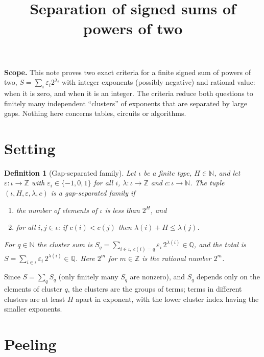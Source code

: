 \documentclass[11pt]{article}
\title{Separation of signed sums of powers of two}
\author{}
\date{}
\newtheorem{definition}{Definition}
\newcommand{\Z}{\mathbb Z}\newcommand{\Q}{\mathbb Q}\newcommand{\N}{\mathbb N}
\begin{document}
\maketitle

\noindent\textbf{Scope.} This note proves two exact criteria for a finite signed sum of powers of two, $S=\sum_i\varepsilon_i2^{\lambda_i}$ with integer exponents (possibly negative) and rational value: when it is zero, and when it is an integer. The criteria reduce both questions to finitely many independent ``clusters'' of exponents that are separated by large gaps. Nothing here concerns tables, circuits or algorithms.

\section{Setting}

\begin{definition}[Gap-separated family]
Let $\iota$ be a finite type, $H\in\N$, and let $\varepsilon:\iota\to\Z$ with $\varepsilon_i\in\{-1,0,1\}$ for all $i$, $\lambda:\iota\to\Z$ and $c:\iota\to\N$. The tuple $(\iota,H,\varepsilon,\lambda,c)$ is a \emph{gap-separated family} if
\begin{enumerate}
\item the number of elements of $\iota$ is less than $2^{H}$, and
\item for all $i,j\in\iota$: if $c(i)<c(j)$ then $\lambda(i)+H\le\lambda(j)$.
\end{enumerate}
For $q\in\N$ the \emph{cluster sum} is $S_q=\sum_{i\in\iota,\ c(i)=q}\varepsilon_i\,2^{\lambda(i)}\in\Q$, and the \emph{total} is $S=\sum_{i\in\iota}\varepsilon_i\,2^{\lambda(i)}\in\Q$. Here $2^{m}$ for $m\in\Z$ is the rational number $2^m$.
\end{definition}

Since $S=\sum_qS_q$ (only finitely many $S_q$ are nonzero), and $S_q$ depends only on the elements of cluster $q$, the clusters are the groups of terms; terms in different clusters are at least $H$ apart in exponent, with the lower cluster index having the smaller exponents.

\section{Peeling}
\end{document}

